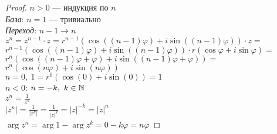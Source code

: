 \begin{normalsize}
\begin{proof}

    $n > 0$ --- индукция по $n$\\
    \textsl{База}: $n = 1$ --- тривиально\\
    \textsl{Переход}: $n - 1 \to n$\\
    $z^n = z^{n-1} \cdot z = r^{n-1}(\cos((n-1)\varphi) + i\sin((n-1)\varphi)) \cdot z = $\\
    $r^{n-1}(\cos((n-1)\varphi) + i\sin((n-1)\varphi)) \cdot r(\cos\varphi + i\sin\varphi) = $\\
    $r^n(\cos((n-1)\varphi + \varphi) + i\sin((n-1)\varphi + \varphi)) = $\\
    $r^n(\cos(n\varphi) + i\sin(n\varphi))$\\

    $n = 0,~ 1 = r^0(\cos(0) + i\sin(0)) = 1$\\

    $n < 0$: $n = -k,~k \in \mathbb{N}$\\
    $z^n = \frac{1}{z^k}$\\
    $|z^n| = \frac{1}{|z^k|} = \frac{1}{|z|^k} = |z|^{-k} = |z|^n$\\
    $\arg z^n = \arg 1 - \arg z^k = 0 - k \varphi = n \varphi$
\end{proof}

\end{normalsize}